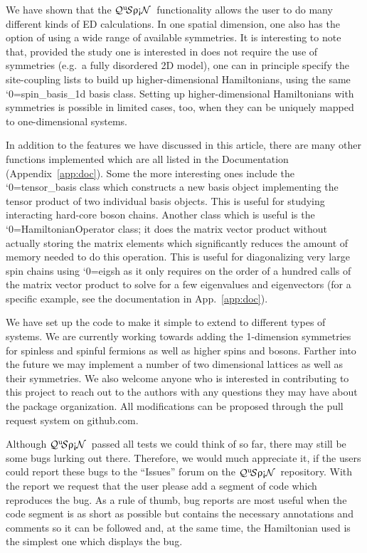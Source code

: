 \documentclass{SciPost}
\newcommand\0{\scalebox{-1}[1]{0}}
\let\svttfamily\ttfamily
\renewcommand\ttfamily{\svttfamily\catcode`0=\active }
\renewcommand\texttt{\bgroup\ttfamily\texttthelp}
\def\texttthelp#1{#1\egroup}
\newcommand{\qspin}{$\mathcal{Q}^{\mathrm{u}}\!\mathcal{S}\uprho\mathrm{\text{\textexclamdown}}\mathcal{N}$}
\begin{document}
We have shown that the \qspin\ functionality allows the user to do many different kinds of ED calculations. In one spatial dimension, one also has the option of using a wide range of available symmetries. It is interesting to note that, provided the study one is interested in does not require the use of symmetries (e.g.~a fully disordered 2D model), one can in principle specify the site-coupling lists to build up higher-dimensional Hamiltonians, using the same \texttt{spin\_basis\_1d} basis class. Setting up higher-dimensional Hamiltonians with symmetries is possible in limited cases, too, when they can be uniquely mapped to one-dimensional systems. 

In addition to the features we have discussed in this article, there are many other functions implemented which are all listed in the Documentation (Appendix~\ref{app:doc}). Some the more interesting ones include the \texttt{tensor\_basis} class which constructs a new basis object implementing the tensor product of two individual basis objects. This is useful for studying interacting hard-core boson chains. Another class which is useful is the \texttt{HamiltonianOperator} class; it does the matrix vector product without actually storing the matrix elements which significantly reduces the amount of memory needed to do this operation. This is useful for diagonalizing very large spin chains using \texttt{eigsh} as it only requires on the order of a hundred calls of the matrix vector product to solve for a few eigenvalues and eigenvectors (for a specific example, see the documentation in App.~\ref{app:doc}).

We have set up the code to make it simple to extend to different types of systems. We are currently working towards adding the 1-dimension symmetries for spinless and spinful fermions as well as higher spins and bosons. Farther into the future we may implement a number of two dimensional lattices as well as their symmetries. We also welcome anyone who is interested in contributing to this project to reach out to the authors with any questions they may have about the package organization. All modifications can be proposed through the pull request system on github.com.  

Although \qspin\ passed all tests we could think of so far, there may still be some bugs lurking out there. Therefore, we would much appreciate it, if the users could report these bugs to the ``Issues'' forum on the \qspin\ repository. With the report we request that the user please add a segment of code which reproduces the bug. As a rule of thumb, bug reports are most useful when the code segment is as short as possible but contains the necessary annotations and comments so it can be followed and, at the same time, the Hamiltonian used is the simplest one which displays the bug.
\end{document}
